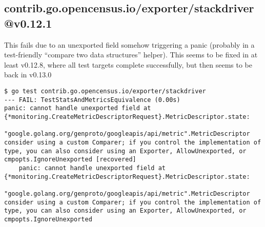 \documentclass[a4paper]{paper}
\begin{document}
\subsection{contrib.go.opencensus.io/exporter/stackdriver@v0.12.1}

This fails due to an unexported field somehow triggering a panic (probably in a test-friendly ``compare two data structures'' helper). This seems to be fixed in at least v0.12.8, where all test targets complete successfully, but then seems to be back in v0.13.0

\begin{verbatim}
$ go test contrib.go.opencensus.io/exporter/stackdriver
--- FAIL: TestStatsAndMetricsEquivalence (0.00s)
panic: cannot handle unexported field at {*monitoring.CreateMetricDescriptorRequest}.MetricDescriptor.state:
	"google.golang.org/genproto/googleapis/api/metric".MetricDescriptor
consider using a custom Comparer; if you control the implementation of type, you can also consider using an Exporter, AllowUnexported, or cmpopts.IgnoreUnexported [recovered]
	panic: cannot handle unexported field at {*monitoring.CreateMetricDescriptorRequest}.MetricDescriptor.state:
	"google.golang.org/genproto/googleapis/api/metric".MetricDescriptor
consider using a custom Comparer; if you control the implementation of type, you can also consider using an Exporter, AllowUnexported, or cmpopts.IgnoreUnexported


\end{verbatim}
\end{document}
